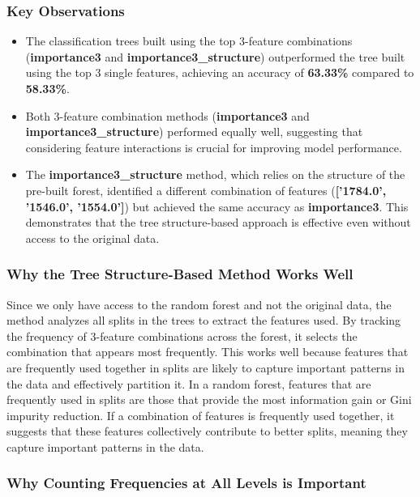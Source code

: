 \documentclass[fleqn,moreauthors,10pt]{ds_report}
\begin{document}
\subsubsection*{Key Observations}
\begin{itemize}
    \item The classification trees built using the top 3-feature combinations (\textbf{importance3} and \textbf{importance3\_structure}) outperformed the tree built using the top 3 single features, achieving an accuracy of \textbf{63.33\%} compared to \textbf{58.33\%}.
    \item Both 3-feature combination methods (\textbf{importance3} and \textbf{importance3\_structure}) performed equally well, suggesting that considering feature interactions is crucial for improving model performance.
    \item The \textbf{importance3\_structure} method, which relies on the structure of the pre-built forest, identified a different combination of features (\textbf{['1784.0', '1546.0', '1554.0']}) but achieved the same accuracy as \textbf{importance3}. This demonstrates that the tree structure-based approach is effective even without access to the original data.
\end{itemize}

\subsubsection*{Why the Tree Structure-Based Method Works Well}

Since we only have access to the random forest and not the original data, the method analyzes all splits in the trees to extract the features used. By tracking the frequency of 3-feature combinations across the forest, it selects the combination that appears most frequently. This works well because features that are frequently used together in splits are likely to capture important patterns in the data and effectively partition it. In a random forest, features that are frequently used in splits are those that provide the most information gain or Gini impurity reduction. If a combination of features is frequently used together, it suggests that these features collectively contribute to better splits, meaning they capture important patterns in the data.


\subsubsection*{Why Counting Frequencies at All Levels is Important}
\end{document}
